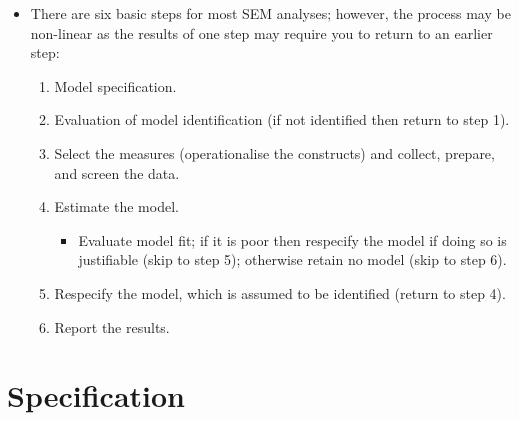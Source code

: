 \documentclass[
]{book}
\providecommand{\tightlist}{%
  \setlength{\itemsep}{0pt}\setlength{\parskip}{0pt}}
\begin{document}
\begin{itemize}
\tightlist
\item
  There are six basic steps for most SEM analyses; however, the process may be non-linear as the results of one step may require you to return to an earlier step:

  \begin{enumerate}
  \def\labelenumi{\arabic{enumi}.}
  \tightlist
  \item
    Model specification.
  \item
    Evaluation of model identification (if not identified then return to step 1).
  \item
    Select the measures (operationalise the constructs) and collect, prepare, and screen the data.
  \item
    Estimate the model.

    \begin{itemize}
    \tightlist
    \item
      Evaluate model fit; if it is poor then respecify the model if doing so is justifiable (skip to step 5); otherwise retain no model (skip to step 6).
    \end{itemize}
  \item
    Respecify the model, which is assumed to be identified (return to step 4).
  \item
    Report the results.
  \end{enumerate}
\end{itemize}

\section{Specification}\label{specification}
\end{document}
